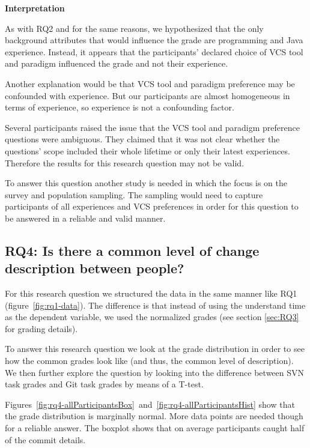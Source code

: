 \documentclass[letterpaper]{article}
\begin{document}


\textbf{Interpretation}

As with RQ2 and for the same reasons, we hypothesized that the only background attributes that would influence the grade are programming and Java experience.
Instead, it appears that the participants' declared choice of VCS tool and paradigm influenced the grade and not their experience.

Another explanation would be that VCS tool and paradigm preference may be confounded with experience.
But our participants are almost homogeneous in terms of experience, so experience is not a confounding factor.

Several participants raised the issue that the VCS tool and paradigm preference questions were ambiguous.
They claimed that it was not clear whether the questions' scope included their whole lifetime or only their latest experiences.
Therefore the results for this research question may not be valid.

To answer this question another study is needed in which the focus is on the survey and population sampling.
The sampling would need to capture participants of all experiences and VCS preferences in order for this question to be answered in a reliable and valid manner.

\subsection{RQ4: Is there a common level of change description between people?}

For this research question we structured the data in the same manner like RQ1 (figure~\ref{fig:rq1-data}).
The difference is that instead of using the understand time as the dependent variable, we used the normalized grades (see section \ref{sec:RQ3} for grading details).

To answer this research question we look at the grade distribution in order to see how the common grades look like (and thus, the common level of description).
We then further explore the question by looking into the difference between SVN task grades and Git task grades by means of a T-test.

Figures~\ref{fig:rq4-allParticipantsBox}~and~\ref{fig:rq4-allParticipantsHist} show that the grade distribution is marginally normal.
More data points are needed though for a reliable answer.
The boxplot shows that on average participants caught half of the commit details.
\end{document}
